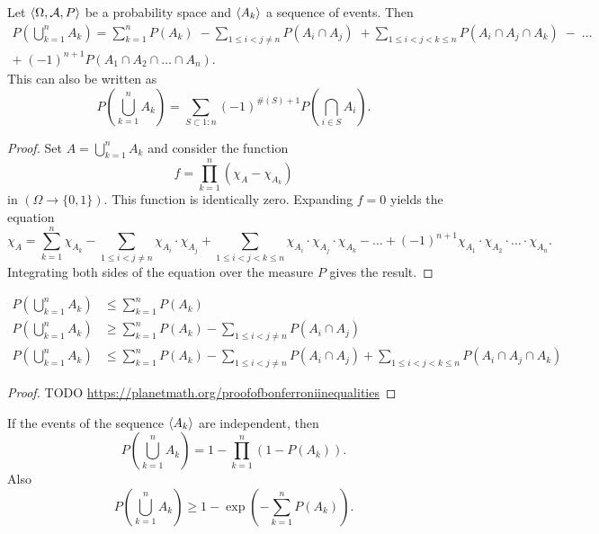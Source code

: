 \begin{theorem}
Let $\left\langle \Omega, \mathcal{A}, P \right\rangle$ be a probability space and $\left\langle A_k \right\rangle$ a sequence of events. Then
\begin{multline*}
P\left(\bigcup^n_{k=1} A_k\right) = \sum_{k=1}^nP(A_k)\; - \sum_{1\leq i< j \neq n}P(A_i\cap A_j)\; + \sum_{1\leq i<j<k\leq n}P(A_i\cap A_j\cap A_k)\; - \;\ldots \\
+ \;(-1)^{n+1}P(A_1\cap A_2 \cap \ldots \cap A_n).
\end{multline*}
This can also be written as
\[ P\left(\bigcup^n_{k=1} A_k\right) = \sum_{S\subset 1:n}(-1)^{\#(S)+1} P \left(\bigcap_{i\in S}A_i\right). \]
\end{theorem}
\begin{proof}
Set $A = \bigcup^n_{k=1}A_k$ and consider the function
\[ f = \prod_{k=1}^n(\chi_A-\chi_{A_k}) \]
in $(\Omega\to \{0,1\})$. This function is identically zero. Expanding $f=0$ yields the equation
\[ \chi_A = \sum_{k=1}^n\chi_{A_k} - \sum_{1\leq i< j \neq n}\chi_{A_i}\cdot\chi_{A_j} + \sum_{1\leq i<j<k\leq n}\chi_{A_i}\cdot\chi_{A_j}\cdot\chi_{A_k} - \ldots + (-1)^{n+1}\chi_{A_1}\cdot\chi_{A_2}\cdot \ldots \cdot\chi_{A_n}. \]
Integrating both sides of the equation over the measure $P$ gives the result.
\end{proof}
\begin{corollary}
\begin{align*}
P\left(\bigcup^n_{k=1} A_k\right) &\leq \sum_{k=1}^nP(A_k) \\
P\left(\bigcup^n_{k=1} A_k\right) &\geq \sum_{k=1}^nP(A_k) - \sum_{1\leq i< j \neq n}P(A_i\cap A_j) \\
P\left(\bigcup^n_{k=1} A_k\right) &\leq \sum_{k=1}^nP(A_k) - \sum_{1\leq i< j \neq n}P(A_i\cap A_j) + \sum_{1\leq i<j<k\leq n}P(A_i\cap A_j\cap A_k)
\end{align*}
\end{corollary}
\begin{proof}
TODO \url{https://planetmath.org/proofofbonferroniinequalities}
\end{proof}
\begin{corollary}
If the events of the sequence $\left\langle A_k \right\rangle$ are independent, then
\[ P\left(\bigcup^n_{k=1} A_k\right) = 1 - \prod^n_{k=1}(1-P(A_k)). \]
Also
\[ P\left(\bigcup^n_{k=1} A_k\right) \geq 1 - \exp\left(-\sum^n_{k=1}P(A_k)\right). \]
\end{corollary}

